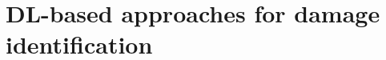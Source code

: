 \documentclass[10pt,aspectratio=169,dvipsnames]{beamer} %
\begin{document}
	\section{DL-based approaches for damage identification}
	\setcounter{subfigure}{0}
\end{document}
